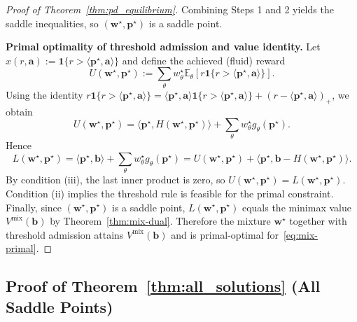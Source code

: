 \documentclass[11pt]{article}
\newcommand{\bb}{\mathbf{b}}
\newcommand{\ba}{\mathbf{a}}
\newcommand{\bp}{\mathbf{p}}
\newcommand{\bw}{\mathbf{w}}
\newcommand{\E}{\mathbb{E}}
\begin{document}
\begin{proof}[Proof of Theorem~\ref{thm:pd_equilibrium}]
Combining Steps 1 and 2 yields the saddle inequalities, so $(\bw^\star, \bp^\star)$ is a saddle point.

\textbf{Primal optimality of threshold admission and value identity.}
Let $x(r, \ba) := \mathbf{1}\{r > \langle \bp^\star, \ba \rangle\}$ and define the achieved (fluid) reward
\[
U(\bw^\star, \bp^\star) := \sum_\theta w_\theta^\star \E_\theta\!\left[r \mathbf{1}\{r > \langle \bp^\star, \ba \rangle\}\right].
\]
Using the identity $r \mathbf{1}\{r > \langle \bp^\star, \ba \rangle\} = \langle \bp^\star, \ba \rangle \mathbf{1}\{r > \langle \bp^\star, \ba \rangle\} + (r - \langle \bp^\star, \ba \rangle)_+$, we obtain
\[
U(\bw^\star, \bp^\star) = \langle \bp^\star, H(\bw^\star, \bp^\star) \rangle + \sum_\theta w_\theta^\star g_\theta(\bp^\star).
\]
Hence
\[
L(\bw^\star, \bp^\star) = \langle \bp^\star, \bb \rangle + \sum_\theta w_\theta^\star g_\theta(\bp^\star) = U(\bw^\star, \bp^\star) + \langle \bp^\star, \bb - H(\bw^\star, \bp^\star) \rangle.
\]
By condition (iii), the last inner product is zero, so $U(\bw^\star, \bp^\star) = L(\bw^\star, \bp^\star)$.
Condition (ii) implies the threshold rule is feasible for the primal constraint.
Finally, since $(\bw^\star, \bp^\star)$ is a saddle point, $L(\bw^\star, \bp^\star)$ equals the minimax value $V^{\mathrm{mix}}(\bb)$ by Theorem~\ref{thm:mix-dual}. Therefore the mixture $\bw^\star$ together with threshold admission attains $V^{\mathrm{mix}}(\bb)$ and is primal-optimal for~\eqref{eq:mix-primal}.
\end{proof}

\subsection{Proof of Theorem~\ref{thm:all_solutions} (All Saddle Points)}
\end{document}

